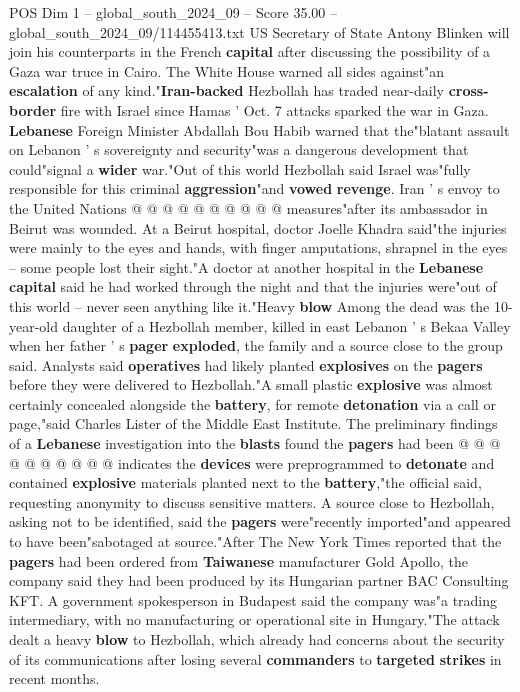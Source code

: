\begin{textsample}{POS Dim 1 – global\_south\_2024\_09 – Score 35.00 – global\_south\_2024\_09/114455413.txt}
US Secretary of State Antony Blinken will join his counterparts in the French \textbf{capital} after discussing the possibility of a Gaza war truce in Cairo.
The White House warned all sides against"an \textbf{escalation} of any kind."\textbf{Iran-backed} Hezbollah has traded near-daily \textbf{cross-border} fire with Israel since Hamas ' Oct. 7 attacks sparked the war in Gaza. \textbf{Lebanese} Foreign Minister Abdallah Bou Habib warned that the"blatant assault on Lebanon ' s sovereignty and security"was a dangerous development that could"signal a \textbf{wider} war."Out of this world Hezbollah said Israel was"fully responsible for this criminal \textbf{aggression}"and \textbf{vowed} \textbf{revenge}.
Iran ' s envoy to the United Nations @ @ @ @ @ @ @ @ @ @ measures"after its ambassador in Beirut was wounded.
At a Beirut hospital, doctor Joelle Khadra said"the injuries were mainly to the eyes and hands, with finger amputations, shrapnel in the eyes -- some people lost their sight."A doctor at another hospital in the \textbf{Lebanese} \textbf{capital} said he had worked through the night and that the injuries were"out of this world -- never seen anything like it."Heavy \textbf{blow} Among the dead was the 10-year-old daughter of a Hezbollah member, killed in east Lebanon ' s Bekaa Valley when her father ' s \textbf{pager} \textbf{exploded}, the family and a source close to the group said.
Analysts said \textbf{operatives} had likely planted \textbf{explosives} on the \textbf{pagers} before they were delivered to Hezbollah."A small plastic \textbf{explosive} was almost certainly concealed alongside the \textbf{battery}, for remote \textbf{detonation} via a call or page,"said Charles Lister of the Middle East Institute.
The preliminary findings of a \textbf{Lebanese} investigation into the \textbf{blasts} found the \textbf{pagers} had been @ @ @ @ @ @ @ @ @ @ indicates the \textbf{devices} were preprogrammed to \textbf{detonate} and contained \textbf{explosive} materials planted next to the \textbf{battery},"the official said, requesting anonymity to discuss sensitive matters.
A source close to Hezbollah, asking not to be identified, said the \textbf{pagers} were"recently imported"and appeared to have been"sabotaged at source."After The New York Times reported that the \textbf{pagers} had been ordered from \textbf{Taiwanese} manufacturer Gold Apollo, the company said they had been produced by its Hungarian partner BAC Consulting KFT.
A government spokesperson in Budapest said the company was"a trading intermediary, with no manufacturing or operational site in Hungary."The attack dealt a heavy \textbf{blow} to Hezbollah, which already had concerns about the security of its communications after losing several \textbf{commanders} to \textbf{targeted} \textbf{strikes} in recent months.

\end{textsample}
